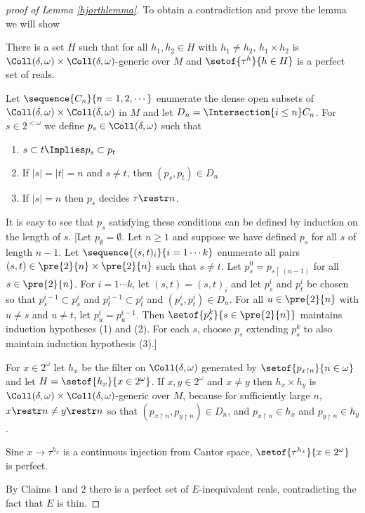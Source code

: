 \documentclass[oneside,12pt]{amsart}
\begin{document}
\begin{proof}[proof of Lemma \ref{hjorthlemma}]
To obtain a contradiction and prove the lemma we will show

\begin{claim}[Claim 2]
There is a set $H$ such that for all $h_1,h_2\in H$ with $h_1\not= h_2$,
$h_1\times h_2$ is $\Coll(\delta,\omega)\times \Coll(\delta,\omega)$-generic over $M$
and $\setof{\tau^{h}}{h\in H}$ is a perfect set of reals.
\end{claim}
\begin{subproof}
Let $\sequence{C_n}{n=1,2,\cdots}$ enumerate the dense open subsets of $\Coll(\delta,\omega)\times \Coll(\delta,\omega)$ in $M$
and let $D_n=\Intersection{i\leq n} C_n$.
For $s\in 2^{<\omega}$ we define $p_s\in \Coll(\delta,\omega)$ such that
\begin{enumerate}
\item $s\subset t \Implies p_s \subset p_t$
\item If $|s| = |t| = n$ and $s\not=t$, then $(p_s,p_t) \in D_n$
\item If $|s| = n$ then $p_s$ decides $\tau\restr n$.
\end{enumerate}
It is easy to see that $p_s$ satisfying these conditions can be defined by induction on the length of $s$.
[Let $p_{\emptyset} = \emptyset$. Let $n\geq 1$ and suppose we have defined $p_s$ for all $s$ of length $n-1$.
Let $\sequence{(s,t)_i}{i=1\cdots k}$ enumerate all pairs $(s,t)\in{\pre{2}{n}\times \pre{2}{n}}$ such that $s\not=t$.
Let $p^0_s = p_{s\upharpoonright (n-1)}$ for all $s\in \pre{2}{n}$. For $i=1\cdots k$, let $(s,t)=(s,t)_i$ and let $p^i_s$ and $p^i_t$ be
chosen so that $p^{i-1}_s\subset p^i_s$ and $p^{i-1}_t\subset p^i_t$ and $(p^i_s,p^i_t)\in D_{n}$. For all $u\in \pre{2}{n}$ with
$u\not=s$ and $u\not=t$, let $p^i_u=p^{i-1}_u$.
Then $\setof{p^k_s}{s\in\pre{2}{n}}$ maintains induction hypotheses (1) and (2). For each $s$, choose $p_s$ extending $p^k_s$ to also
maintain induction hypothesis (3).]

For $x\in 2^{\omega}$ let $h_x$ be the filter on $\Coll(\delta,\omega)$ generated by $\setof{p_{x\upharpoonright n}}{n\in\omega}$
and let $H=\setof{h_x}{x\in 2^{\omega}}$. If $x,y\in 2^{\omega}$ and $x\not=y$ then $h_x\times h_y$ is
$\Coll(\delta,\omega)\times \Coll(\delta,\omega)$-generic over $M$, because for sufficiently large $n$,
$x\restr n \not= y\restr n$ so that $(p_{x\upharpoonright n },p_{y\upharpoonright n })\in D_n$, and $p_{x\upharpoonright n }\in h_x$ and
$p_{y\upharpoonright n }\in h_y$.

Sine $x\to \tau^{h_x}$ is a continuous injection from Cantor space, $\setof{\tau^{h_x}}{x\in 2^{\omega}}$ is perfect.
\end{subproof}

By Claims 1 and 2 there is a perfect set of $E$-inequivalent reals, contradicting the fact that $E$ is thin.

\end{proof}
\end{document}
